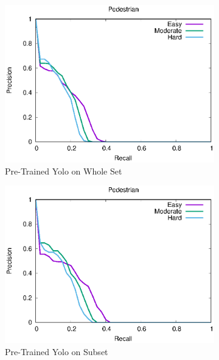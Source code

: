 \begin{figure}[H]
\centering
\begin{subfigure}[t]{.24\textwidth}
    \centering
    \includegraphics[width=1.0\linewidth]{img/yolo_Nov_4/plot_valid/pedestrian_detection.eps}
    \caption{Pre-Trained Yolo on Whole Set}
\end{subfigure}
\begin{subfigure}[t]{.24\textwidth}
    \centering
    \includegraphics[width=1.0\linewidth]{img/yolo_Nov_4/plot_valid_30/pedestrian_detection.eps}
    \caption{Pre-Trained Yolo on Subset}
\end{subfigure}
\begin{subfigure}[t]{.24\textwidth}
    \centering

\end{subfigure}
\end{figure}

